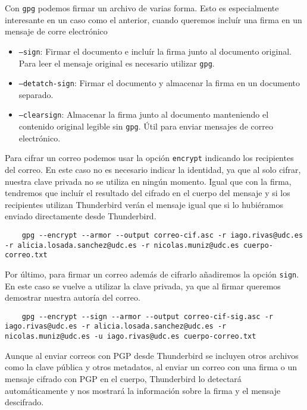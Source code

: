 \begin{tcolorbox}[
    colback=orange!5!white,
    colframe=orange!75!black,
    title=Tipos de firmas en PGP
]
Con \texttt{gpg} podemos firmar un archivo de varias forma. Esto es especialmente interesante en un caso como el anterior, cuando queremos incluír una firma en un mensaje de corre electrónico
\begin{itemize}
    \item \texttt{--sign}: Firmar el documento e incluír la firma junto al documento original. Para leer el mensaje original es necesario utilizar \texttt{gpg}.
    \item \texttt{--detatch-sign}: Firmar el documento y almacenar la firma en un documento separado.
    \item \texttt{--clearsign}: Almacenar la firma junto al documento manteniendo el contenido original legible sin \texttt{gpg}. Útil para enviar mensajes de correo electrónico.
\end{itemize}
\end{tcolorbox}

Para cifrar un correo podemos usar la opción \texttt{encrypt} indicando los recipientes del correo. En este caso no es necesario indicar la identidad, ya que al solo cifrar, nuestra clave privada no se utiliza en ningún momento. Igual que con la firma, tendremos que incluír el resultado del cifrado en el cuerpo del mensaje y si los recipientes utilizan Thunderbird verán el mensaje igual que si lo hubiéramos enviado directamente desde Thunderbird.

\begin{verbatim}
    gpg --encrypt --armor --output correo-cif.asc -r iago.rivas@udc.es -r alicia.losada.sanchez@udc.es -r nicolas.muniz@udc.es cuerpo-correo.txt
\end{verbatim}

Por último, para firmar un correo además de cifrarlo añadiremos la opción \texttt{sign}. En este caso se vuelve a utilizar la clave privada, ya que al firmar queremos demostrar nuestra autoría del correo.

\begin{verbatim}
    gpg --encrypt --sign --armor --output correo-cif-sig.asc -r iago.rivas@udc.es -r alicia.losada.sanchez@udc.es -r nicolas.muniz@udc.es -u iago.rivas@udc.es cuerpo-correo.txt
\end{verbatim}

Aunque al enviar correos con PGP desde Thunderbird se incluyen otros archivos como la clave pública y otros metadatos, al enviar un correo con una firma o un mensaje cifrado con PGP en el cuerpo, Thunderbird lo detectará automáticamente y nos mostrará la información sobre la firma y el mensaje descifrado.